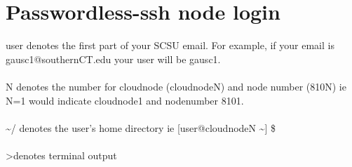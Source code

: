 \section*{Passwordless-ssh node login}
user denotes the first part of your SCSU email.  For example, if your email is gausc1@southernCT.edu your user will be gausc1.\\\\N denotes the number for cloudnode (cloudnodeN) and node number (810N) ie N=1 would indicate cloudnode1 and nodenumber 8101.\\\\
\textasciitilde{}/ denotes the user's home directory ie [user@cloudnodeN \textasciitilde{}] \$\\\\\textgreater denotes terminal output\\

